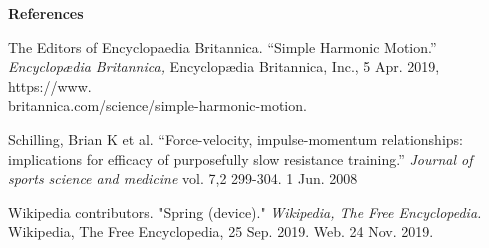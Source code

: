 \documentclass{article}
\begin{document}
\LARGE\textbf{References}

\normalsize The Editors of Encyclopaedia Britannica. “Simple Harmonic Motion.” \textit{Encyclopædia Britannica,} Encyclopædia Britannica, Inc., 5 Apr. 2019, https://www.\\britannica.com/science/simple-harmonic-motion.

Schilling, Brian K et al. “Force-velocity, impulse-momentum relationships: implications for efficacy of purposefully slow resistance training.” \textit{Journal of sports science and medicine} vol. 7,2 299-304. 1 Jun. 2008

Wikipedia contributors. "Spring (device)." \textit{Wikipedia, The Free Encyclopedia.} Wikipedia, The Free Encyclopedia, 25 Sep. 2019. Web. 24 Nov. 2019.
\end{document}
